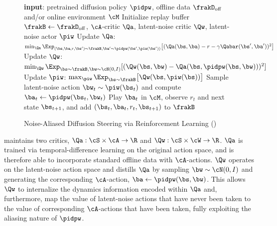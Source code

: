 \begin{figure}[H]
\vspace{-1.5em}
    \centering
    \begin{minipage}{\linewidth}
    \begin{algorithm}[H]
      \caption{Noise-Aliased Diffusion Steering via Reinforcement Learning (\algnamena)}
      \begin{algorithmic}[1]
        \State \textbf{input}: pretrained diffusion policy $\pidpw$, offline data $\frakD_{\mathrm{off}}$ and/or online environment $\cM$
        \State Initialize replay buffer $\frakB \leftarrow \frakD_{\mathrm{off}}$, $\cA$-critic $\Qa$, latent-noise critic $\Qw$, latent-noise actor $\piw$
          \State Update $\Qa$: $\textstyle \min_{\Qa} \Exp_{(\bs,\ba,r,\bs') \sim \frakB, \ba' \sim \pidpw(\bs',\piw(\bs'))} \big [ ( \Qa(\bs,\ba) - r - \gamma \Qabar(\bs', \ba'))^2 \big ]$
     \State Update $\Qw$: $\min_{\Qw} \Exp_{\bs \sim \frakB, \bw \sim \cN(0,I)}[(\Qw(\bs, \bw) - \Qa(\bs,\pidpw(\bs,\bw)))^2]$
     \State Update $\piw$: $\max_{\piw} \Exp_{\bs \sim \frakB} \big [ \Qw(\bs,\piw(\bs)) \big ]$
          \State Sample latent-noise action $\bw_t \sim \piw(\bs_t)$ and compute $\ba_t \leftarrow \pidpw(\bs_t, \bw_t)$
          \State Play $\ba_t$ in $\cM$, observe $r_t$ and next state $\bs_{t+1}$, and add $(\bs_t, \ba_t, r_t, \bs_{t+1})$ to $\frakB$
        \EndIf
        \EndFor
      \end{algorithmic}
    \label{alg:main}
\end{algorithm}
\vspace{-2.5em}
\end{minipage}
\end{figure}


\algnamena maintains two critics, $\Qa : \cS \times \cA \rightarrow \R$ and $\Qw : \cS \times \cW \rightarrow \R$. 
$\Qa$ is trained via temporal-difference learning on the original action space, and is therefore able to incorporate standard offline data with $\cA$-actions. $\Qw$ operates on the latent-noise action space and distills $\Qa$ by sampling $\bw \sim \cN(0,I)$ and generating the corresponding $\cA$-action, $\ba \leftarrow \pidpw(\bs,\bw)$. This allows $\Qw$ to internalize the dynamics information encoded within $\Qa$ and, furthermore, map the value of latent-noise actions that have never been taken to the value of corresponding $\cA$-actions that have been taken, fully exploiting the aliasing nature of $\pidpw$.\loose



